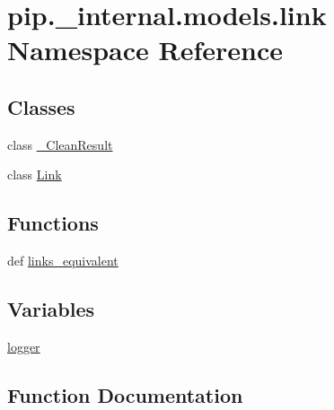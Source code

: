 \hypertarget{namespacepip_1_1__internal_1_1models_1_1link}{}\section{pip.\+\_\+internal.\+models.\+link Namespace Reference}
\label{namespacepip_1_1__internal_1_1models_1_1link}
\subsection*{Classes}
\begin{DoxyCompactItemize}
\item 
class \hyperlink{classpip_1_1__internal_1_1models_1_1link_1_1__CleanResult}{\+\_\+\+Clean\+Result}
\item 
class \hyperlink{classpip_1_1__internal_1_1models_1_1link_1_1Link}{Link}
\end{DoxyCompactItemize}
\subsection*{Functions}
\begin{DoxyCompactItemize}
\item 
def \hyperlink{namespacepip_1_1__internal_1_1models_1_1link_a177091833e3650ccaa4511fc6cd09d82}{links\+\_\+equivalent}
\end{DoxyCompactItemize}
\subsection*{Variables}
\begin{DoxyCompactItemize}
\item 
\hyperlink{namespacepip_1_1__internal_1_1models_1_1link_a0f4a689cace1d684305d6d5f7b30d653}{logger}
\end{DoxyCompactItemize}


\subsection{Function Documentation}
\mbox{\label{namespacepip_1_1__internal_1_1models_1_1link_a177091833e3650ccaa4511fc6cd09d82}} 
